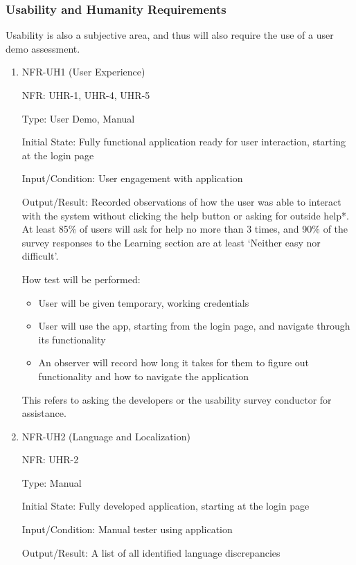 \documentclass[12pt, titlepage]{article}
\begin{document}
\subsubsection{Usability and Humanity Requirements}
Usability is also a subjective area, and thus will also require the use of a
user demo assessment.
\begin{enumerate}

  \item{NFR-UH1 (User Experience)\\}
  
  NFR: UHR-1, UHR-4, UHR-5

  Type: User Demo, Manual

  Initial State: Fully functional application ready for user interaction,
  starting at the login page
  
  Input/Condition: User engagement with application
  
  Output/Result: Recorded observations of how the user was able to interact with
  the system without clicking the help button or asking for outside help*. At
  least 85\% of users will ask for help no more than 3 times, and 90\% of the
  survey responses to the Learning section are at least `Neither easy nor
  difficult'.
  
  How test will be performed:
  \begin{itemize}
    \item User will be given temporary, working credentials 
    \item User will use the app, starting from the login page, and navigate
    through its functionality
    \item An observer will record how long it takes for them to figure out
    functionality and how to navigate the application
  \end{itemize}
  {\footnotesize *This refers to asking the developers or the usability survey conductor
  for assistance.}
            
  \item{NFR-UH2 (Language and Localization)\\}
  
  NFR: UHR-2
  
  Type: Manual
  
  Initial State: Fully developed application, starting at the login page
  
  Input/Condition: Manual tester using application
  
  Output/Result: A list of all identified language discrepancies
  

\end{enumerate}
\end{document}
